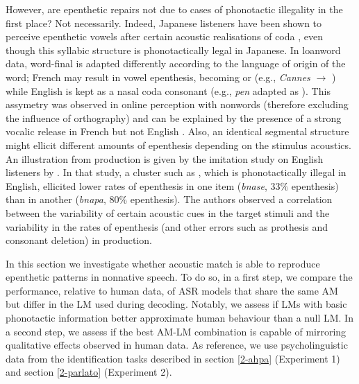 However, are epenthetic repairs not due to cases of phonotactic illegality in the first place? Not necessarily. Indeed, Japanese listeners have been shown to perceive epenthetic vowels after certain acoustic realisations of coda \textipa{[n]}, even though this syllabic structure is phonotactically legal in Japanese. In loanword data, word-final \textipa{[n]} is adapted differently according to the language of origin of the word; French  may result in vowel epenthesis, becoming \textipa{[n:u]} or \textipa{[nu]} (e.g., \textit{Cannes}  $\rightarrow$ ) while English \textipa{[n]} is kept as a nasal coda consonant (e.g., \textit{pen} adapted as ). This assymetry was observed in online perception with nonwords (therefore excluding the influence of orthography) and can be explained by the presence of a strong vocalic release in French \textipa{[n]} but not English \textipa{[n]} \cite{peperkamp2008}.
Also, an identical segmental structure might ellicit different amounts of epenthesis depending on the stimulus acoustics. An illustration from production is given by the imitation study on English listeners by \cite{wilson2013}. In that study, a cluster such as , which is phonotactically illegal in English, ellicited lower rates of epenthesis in one item (\textit{bnase}, $33\%$ epenthesis) than in another (\textit{bnapa}, $80\%$ epenthesis). The authors observed a correlation between the variability of certain acoustic cues in the target stimuli and the variability in the rates of epenthesis (and other errors such as prothesis and consonant deletion) in production.

In this section we investigate whether acoustic match is able to reproduce epenthetic patterns in nonnative speech. To do so, in a first step, we compare the performance, relative to human data, of ASR models that share the same AM but differ in the LM used during decoding. Notably, we assess if LMs with basic phonotactic information better approximate human behaviour than a null LM. In a second step, we assess if the best AM-LM combination is capable of mirroring qualitative effects observed in human data.
As reference, we use psycholinguistic data from the identification tasks described in section \ref{2-ahpa} (Experiment 1) and section \ref{2-parlato} (Experiment 2). 


